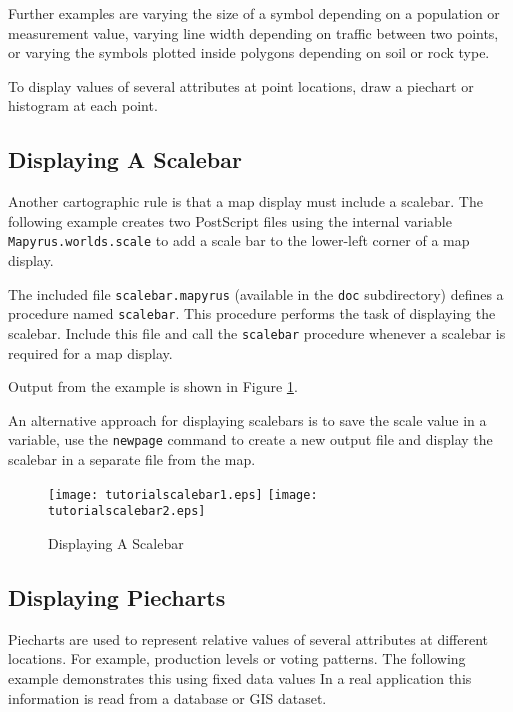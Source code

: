 Further examples are varying the size of a symbol depending on a
population or measurement value, varying line width depending on
traffic between two points, or varying the symbols plotted inside
polygons depending on soil or rock type.

To display values of several attributes at point locations, draw a
piechart or histogram at each point.

\subsection{Displaying A Scalebar}
\label{tutorialscalebar}

Another cartographic rule is that a map display must include a scalebar.  The
following example creates two PostScript files using the internal variable
\texttt{Mapyrus.worlds.scale} to add a scale bar to the lower-left corner of a
map display.

The included file \texttt{scalebar.mapyrus} (available in the \texttt{doc}
subdirectory) defines a procedure named \texttt{scalebar}.  This procedure
performs the task of displaying the scalebar.  Include this file and call the
\texttt{scalebar} procedure whenever a scalebar is required for a map display.

Output from the example is shown in Figure \ref{tutorialscalebar1}.

An alternative approach for displaying scalebars is to save the scale value in
a variable, use the \texttt{newpage} command to create a new output file and
display the scalebar in a separate file from the map.



\begin{figure}[htb]
\texttt{[image: tutorialscalebar1.eps]}
\texttt{[image: tutorialscalebar2.eps]}
\caption{Displaying A Scalebar}
\label{tutorialscalebar1}
\end{figure}

\subsection{Displaying Piecharts}

Piecharts are used to represent relative values of several attributes at
different locations.  For example, production levels or voting patterns.  The
following example demonstrates this using fixed data values
In a real application this information is read from a
database or GIS dataset.

